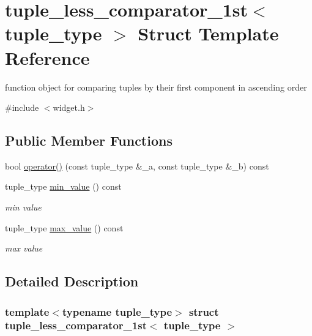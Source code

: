 \hypertarget{structtuple__less__comparator__1st}{}\section{tuple\+\_\+less\+\_\+comparator\+\_\+1st$<$ tuple\+\_\+type $>$ Struct Template Reference}
\label{structtuple__less__comparator__1st}


function object for comparing tuples by their first component in ascending order  




{\ttfamily \#include $<$widget.\+h$>$}

\subsection*{Public Member Functions}
\begin{DoxyCompactItemize}
\item 
bool \hyperlink{structtuple__less__comparator__1st_ad97f49eea57d8fec456d9d00a5126deb}{operator()} (const tuple\+\_\+type \&\+\_\+a, const tuple\+\_\+type \&\+\_\+b) const
\item 
tuple\+\_\+type \hyperlink{structtuple__less__comparator__1st_a1dc22790efdf3705634387a96a848d89}{min\+\_\+value} () const
\begin{DoxyCompactList}\small\item\em min value \end{DoxyCompactList}\item 
tuple\+\_\+type \hyperlink{structtuple__less__comparator__1st_ab43723d6ebd5e36767f98828e2df83a8}{max\+\_\+value} () const
\begin{DoxyCompactList}\small\item\em max value \end{DoxyCompactList}\end{DoxyCompactItemize}


\subsection{Detailed Description}
\subsubsection*{template$<$typename tuple\+\_\+type$>$\newline
struct tuple\+\_\+less\+\_\+comparator\+\_\+1st$<$ tuple\+\_\+type $>$}

